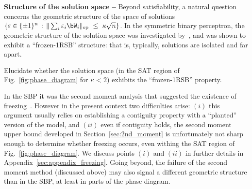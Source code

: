 \myskip
\textbf{Structure of the solution space --}
Beyond satisfiability, a natural question
concerns
the geometric structure 
of the space of solutions $\{\eps \in \{\pm 1\}^n \, : \, \|\sum_i \eps_i \bW_i\|_\op~\leq~\kappa \sqrt{n}\}$.
In the symmetric binary perceptron, the geometric structure of the solution space was investigated by~\cite{aubin2019storage,perkins2021frozen,abbe2022proof},
and was shown to exhibit a ``frozen-1RSB'' structure: that is, typically, solutions are isolated and far apart.
\begin{openquestion}\label{op:freezing}
    Elucidate whether the solution space (in the SAT region of Fig.~\ref{fig:phase_diagram} for $\kappa < 2$) exhibits the ``frozen-1RSB'' property.
\end{openquestion}
\noindent
In the SBP it was the second moment analysis that suggested the existence of freezing~\citep{aubin2019storage}.
However in the present context two 
difficulties arise: $(i)$ this argument usually relies on establishing  a contiguity property with a ``planted'' version of the model, 
and $(ii)$ even if contiguity holds, the second moment upper bound developed in Section~\ref{sec:2nd_moment} 
is unfortunately not sharp enough to determine whether freezing occurs, 
even withing the SAT region of Fig.~\ref{fig:phase_diagram}.
We discuss points $(i)$ and $(ii)$ in further details in Appendix~\ref{sec:appendix_freezing}.
Going beyond, the failure of the second moment method (discussed above)
may also signal a different geometric structure than in the SBP, at least in parts of the phase diagram.

